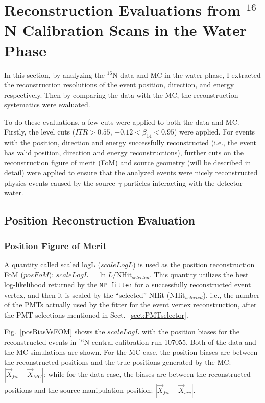 \section{Reconstruction Evaluations from $^{16}$N Calibration Scans in the Water Phase}

In this section, by analyzing the $^{16}$N data and MC in the water phase, I extracted the reconstruction resolutions of the event position, direction, and energy respectively. Then by comparing the data with the MC, the reconstruction systematics were evaluated.

To do these evaluations, a few cuts were applied to both the data and MC. Firstly, the level cuts  ($ITR>0.55$, $-0.12<\beta_{14}<0.95$) were applied. For events with the position, direction and energy successfully reconstructed (i.e., the event has valid position, direction and energy reconstructions), further cuts on the reconstruction figure of merit (FoM) and source geometry (will be described in detail) were applied to ensure that the analyzed events were nicely reconstructed physics events caused by the source $\gamma$ particles interacting with the detector water.

\subsection{Position Reconstruction Evaluation}
\subsubsection{Position Figure of Merit}
A quantity called scaled logL ($scaleLogL$) is used as the position reconstruction FoM ($posFoM$): $scaleLogL = \ln L/\mathrm{NHit}_{selected}$. This quantity utilizes the best log-likelihood returned by the \texttt{MP fitter} for a successfully reconstructed event vertex, and then it is scaled by the ``selected'' NHit ($\mathrm{NHit}_{selected}$), i.e., the number of the PMTs actually used by the fitter for the event vertex reconstruction, after the PMT selections mentioned in Sect.~\ref{sect:PMTselector}.

Fig.~\ref{posBiasVsFOM} shows the $scaleLogL$ with the position biases for the reconstructed events in $^{16}$N central calibration run-107055. Both of the data and the MC simulations are shown. For the MC case, the position biases are between the reconstructed positions and the true positions generated by the MC: $|\vec{X}_{fit}-\vec{X}_{MC}|$; while for the data case, the biases are between the reconstructed positions and the source manipulation position: $|\vec{X}_{fit}-\vec{X}_{src}|$.

